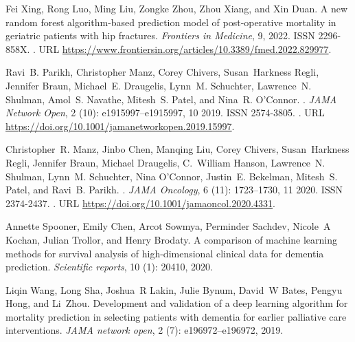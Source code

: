 \documentclass{article}
\begin{document}
\begin{thebibliography}{60}
Fei Xing, Rong Luo, Ming Liu, Zongke Zhou, Zhou Xiang, and Xin Duan.
\newblock A new random forest algorithm-based prediction model of
  post-operative mortality in geriatric patients with hip fractures.
\newblock \emph{Frontiers in Medicine}, 9, 2022.
\newblock ISSN 2296-858X.
\newblock {}.
\newblock URL
  \url{https://www.frontiersin.org/articles/10.3389/fmed.2022.829977}.

Ravi~B. Parikh, Christopher Manz, Corey Chivers, Susan~Harkness Regli, Jennifer
  Braun, Michael~E. Draugelis, Lynn~M. Schuchter, Lawrence~N. Shulman, Amol~S.
  Navathe, Mitesh~S. Patel, and Nina~R. O’Connor.
.
\newblock \emph{JAMA Network Open}, 2 (10):
  e1915997--e1915997, 10 2019.
\newblock ISSN 2574-3805.
\newblock {}.
\newblock URL \url{https://doi.org/10.1001/jamanetworkopen.2019.15997}.

Christopher~R. Manz, Jinbo Chen, Manqing Liu, Corey Chivers, Susan~Harkness
  Regli, Jennifer Braun, Michael Draugelis, C.~William Hanson, Lawrence~N.
  Shulman, Lynn~M. Schuchter, Nina O’Connor, Justin~E. Bekelman, Mitesh~S.
  Patel, and Ravi~B. Parikh.
.
\newblock \emph{JAMA Oncology}, 6 (11): 1723--1730, 11 2020.
\newblock ISSN 2374-2437.
\newblock {}.
\newblock URL \url{https://doi.org/10.1001/jamaoncol.2020.4331}.

Annette Spooner, Emily Chen, Arcot Sowmya, Perminder Sachdev, Nicole~A Kochan,
  Julian Trollor, and Henry Brodaty.
\newblock A comparison of machine learning methods for survival analysis of
  high-dimensional clinical data for dementia prediction.
\newblock \emph{Scientific reports}, 10 (1): 20410, 2020.

Liqin Wang, Long Sha, Joshua~R Lakin, Julie Bynum, David~W Bates, Pengyu Hong,
  and Li~Zhou.
\newblock Development and validation of a deep learning algorithm for mortality
  prediction in selecting patients with dementia for earlier palliative care
  interventions.
\newblock \emph{JAMA network open}, 2 (7): e196972--e196972,
  2019.


\end{thebibliography}
\end{document}
